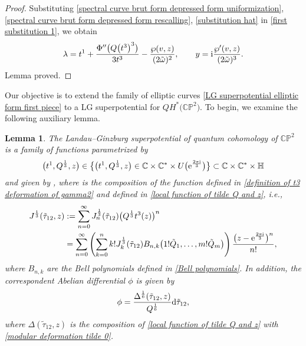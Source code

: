 \documentclass[pdftex]{sigma}
\numberwithin{equation}{section}
\newtheorem{Lemma}[Theorem]{Lemma}
\begin{document}
\begin{proof}
Substituting \eqref{spectral curve brut form depressed form uniformization}, \eqref{spectral curve brut form depressed form rescalling}, \eqref{substitution hat} in \eqref{first substitution 1}, we obtain
\begin{gather*}
\lambda=t^1+\frac{\Phi^{\prime\prime}\bigl(Q\bigl(t^3\bigr)^3\bigr)}{3t^3}-\frac{\wp(v,z)}{(2\tilde\omega)^2},\qquad
y={\rm i}\frac{\wp^{\prime}(v,z)}{(2\tilde\omega)^3}.
\end{gather*}
Lemma proved.
\end{proof}

Our objective is to extend the family of elliptic curves \eqref{LG superpotential elliptic form first piece} to a LG superpotential for $QH^{*}\bigl(\mathbb{CP}^2\bigr)$. To begin, we examine the following auxiliary lemma.

\begin{Lemma}
The Landau--Ginzburg superpotential of quantum cohomology of $\mathbb{CP}^2$ is a family of functions
parametrized by
\begin{gather*}
\bigl(t^1,Q^{\frac{1}{3}},z\bigr)\in 	\bigl\{ \bigl(t^1,Q^{\frac{1}{3}},z\bigr) \in \mathbb{C}\times\mathbb{C}^{*}\times U\bigl({\rm e}^{\frac{2\pi {\rm i}}{3}}\bigr) \bigr\}\subset \mathbb{C}\times\mathbb{C}^{*}\times\mathbb{H}
\end{gather*}
and given by
,
where  is the composition of the function  defined in \eqref{definition of t3 deformation of gamma2} and  defined in \eqref{local function of tilde Q and z}, i.e.,
\begin{align*}
J^{\frac{1}{3}}(\tilde\tau_{12}, z)&:=\sum_{n=0}^{\infty}J_n^{\frac{1}{3}}(\tilde\tau_{12})\bigl( Q^{\frac{1}{3}}t^3(z)\bigr)^n\\
&=\sum_{n=0}^{\infty}\left( \sum_{k=0}^{n} k! J_k^{\frac{1}{3}}(\tilde\tau_{12}) B_{n,k}\bigl(1!\tilde Q_1,\dots,m!\tilde Q_m\bigr) \right)\frac{\bigl(z-{\rm e}^{\frac{2\pi {\rm i}}{3}} \bigr)^n}{n!},
\end{align*}
where $B_{n,k}$ are the Bell polynomials defined in \eqref{Bell polynomials}.
 In addition, the correspondent Abelian differential $\phi$ is given by
\begin{gather*}
\phi=\frac{\Delta^{\frac{1}{6}}(\tilde\tau_{12},z)}{Q^{\frac{1}{6}}} {\rm d}\tilde\tau_{12},
\end{gather*}
where $\Delta(\tilde\tau_{12},z)$ is the composition of \eqref{local function of tilde Q and z} with \eqref{modular deformation tilde 0}.
\end{Lemma}
\end{document}
